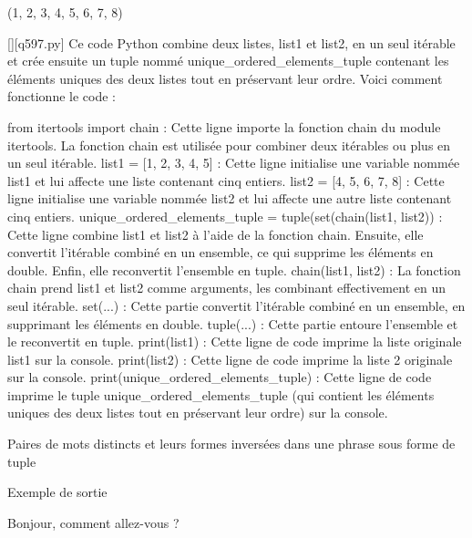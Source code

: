 (1, 2, 3, 4, 5, 6, 7, 8)
        \par
        \begin{solution}
            \renewcommand{\nomfichier}{q597.py}
            \pythonfile{\chemincode \nomfichier}[][\nomfichier]
            Ce code Python combine deux listes, list1 et list2, en un seul itérable et crée ensuite un tuple nommé unique_ordered_elements_tuple contenant les éléments uniques des deux listes tout en préservant leur ordre. Voici comment fonctionne le code :

    from itertools import chain : Cette ligne importe la fonction chain du module itertools. La fonction chain est utilisée pour combiner deux itérables ou plus en un seul itérable.
    list1 = [1, 2, 3, 4, 5] : Cette ligne initialise une variable nommée list1 et lui affecte une liste contenant cinq entiers.
    list2 = [4, 5, 6, 7, 8] : Cette ligne initialise une variable nommée list2 et lui affecte une autre liste contenant cinq entiers.
    unique_ordered_elements_tuple = tuple(set(chain(list1, list2)) : Cette ligne combine list1 et list2 à l'aide de la fonction chain. Ensuite, elle convertit l'itérable combiné en un ensemble, ce qui supprime les éléments en double. Enfin, elle reconvertit l'ensemble en tuple.
        chain(list1, list2) : La fonction chain prend list1 et list2 comme arguments, les combinant effectivement en un seul itérable.
        set(...) : Cette partie convertit l'itérable combiné en un ensemble, en supprimant les éléments en double.
        tuple(...) : Cette partie entoure l'ensemble et le reconvertit en tuple.
    print(list1) : Cette ligne de code imprime la liste originale list1 sur la console.
    print(list2) : Cette ligne de code imprime la liste 2 originale sur la console.
    print(unique_ordered_elements_tuple) : Cette ligne de code imprime le tuple unique_ordered_elements_tuple (qui contient les éléments uniques des deux listes tout en préservant leur ordre) sur la console.
        \end{solution}
        

        \question
        Paires de mots distincts et leurs formes inversées dans une phrase sous forme de tuple

Exemple de sortie

Bonjour, comment allez-vous ?

